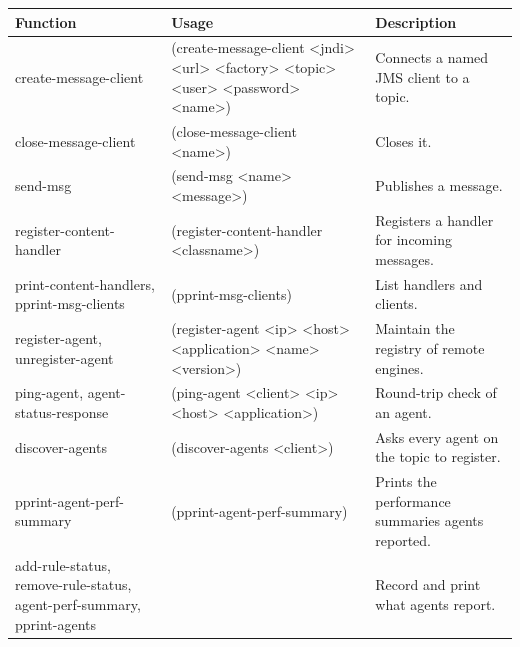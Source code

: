 \begin{longtable}{>{\ttfamily\raggedright\arraybackslash}p{1.6in} >{\ttfamily\small\raggedright\arraybackslash}p{2.2in} >{\raggedright\arraybackslash}p{2.2in}}
\toprule
\normalfont Function & \normalfont Usage & Description \\
\midrule
\endhead
create-\br{}message-\br{}client & (create-message-client <jndi> <url> <factory> <topic> <user> <password> <name>) & Connects a named JMS client to a topic. \\
close-\br{}message-\br{}client & (close-message-client <name>) & Closes it. \\
send-msg & (send-msg <name> <message>) & Publishes a message. \\
register-\br{}content-\br{}handler & (register-content-handler <classname>) & Registers a handler for incoming messages. \\
print-\br{}content-\br{}handlers, pprint-\br{}msg-\br{}clients & (pprint-msg-clients) & List handlers and clients. \\
register-\br{}agent, unregister-\br{}agent & (register-agent <ip> <host> <application> <name> <version>) & Maintain the registry of remote engines. \\
ping-\br{}agent, agent-\br{}status-\br{}response & (ping-agent <client> <ip> <host> <application>) & Round-trip check of an agent. \\
discover-\br{}agents & (discover-agents <client>) & Asks every agent on the topic to register. \\
pprint-\br{}agent-\br{}perf-\br{}summary & (pprint-agent-perf-summary) & Prints the performance summaries agents reported. \\
add-\br{}rule-\br{}status, remove-\br{}rule-\br{}status, agent-\br{}perf-\br{}summary, pprint-\br{}agents & & Record and print what agents report. \\
\bottomrule
\end{longtable}
